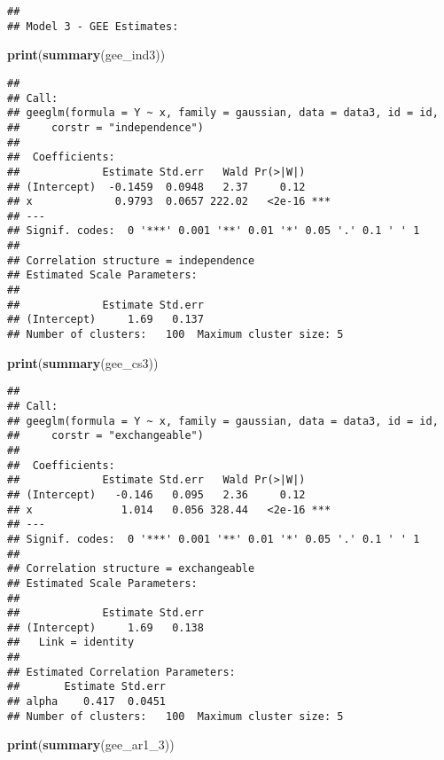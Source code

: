 \documentclass[
]{article}
\newenvironment{Shaded}{\begin{snugshade}}{\end{snugshade}}
\newcommand{\FunctionTok}[1]{\textcolor[rgb]{0.13,0.29,0.53}{\textbf{#1}}}
\newcommand{\NormalTok}[1]{#1}
\begin{document}
\begin{verbatim}
## 
## Model 3 - GEE Estimates:
\end{verbatim}

\begin{Shaded}
\begin{Highlighting}[]
\FunctionTok{print}\NormalTok{(}\FunctionTok{summary}\NormalTok{(gee\_ind3))}
\end{Highlighting}
\end{Shaded}

\begin{verbatim}
## 
## Call:
## geeglm(formula = Y ~ x, family = gaussian, data = data3, id = id, 
##     corstr = "independence")
## 
##  Coefficients:
##             Estimate Std.err   Wald Pr(>|W|)    
## (Intercept)  -0.1459  0.0948   2.37     0.12    
## x             0.9793  0.0657 222.02   <2e-16 ***
## ---
## Signif. codes:  0 '***' 0.001 '**' 0.01 '*' 0.05 '.' 0.1 ' ' 1
## 
## Correlation structure = independence 
## Estimated Scale Parameters:
## 
##             Estimate Std.err
## (Intercept)     1.69   0.137
## Number of clusters:   100  Maximum cluster size: 5
\end{verbatim}

\begin{Shaded}
\begin{Highlighting}[]
\FunctionTok{print}\NormalTok{(}\FunctionTok{summary}\NormalTok{(gee\_cs3))}
\end{Highlighting}
\end{Shaded}

\begin{verbatim}
## 
## Call:
## geeglm(formula = Y ~ x, family = gaussian, data = data3, id = id, 
##     corstr = "exchangeable")
## 
##  Coefficients:
##             Estimate Std.err   Wald Pr(>|W|)    
## (Intercept)   -0.146   0.095   2.36     0.12    
## x              1.014   0.056 328.44   <2e-16 ***
## ---
## Signif. codes:  0 '***' 0.001 '**' 0.01 '*' 0.05 '.' 0.1 ' ' 1
## 
## Correlation structure = exchangeable 
## Estimated Scale Parameters:
## 
##             Estimate Std.err
## (Intercept)     1.69   0.138
##   Link = identity 
## 
## Estimated Correlation Parameters:
##       Estimate Std.err
## alpha    0.417  0.0451
## Number of clusters:   100  Maximum cluster size: 5
\end{verbatim}

\begin{Shaded}
\begin{Highlighting}[]
\FunctionTok{print}\NormalTok{(}\FunctionTok{summary}\NormalTok{(gee\_ar1\_3))}
\end{Highlighting}
\end{Shaded}
\end{document}
